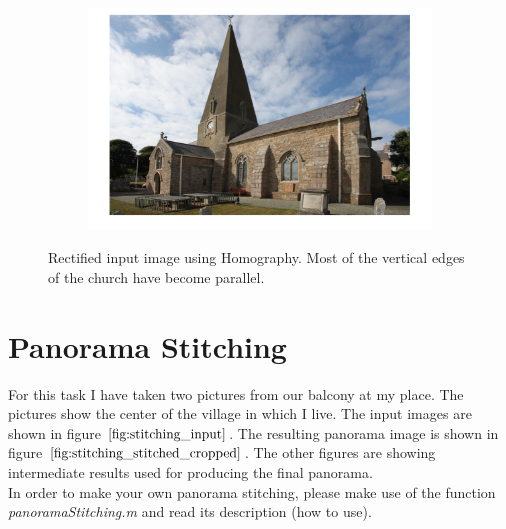 \documentclass{paper}
\begin{document}
\begin{figure}[H]
    \centering
    \begin{subfigure}{1.0\textwidth}
        \includegraphics[width=\textwidth]{rectify/rectified_skewed_church}
    \end{subfigure}
    
    \caption{Rectified input image using Homography. Most of the vertical edges of the church have become parallel. }
    \label{fig:rectified_skewed_church}       
\end{figure}


\section{Panorama Stitching}
For this task I have taken two pictures from our balcony at my place. The pictures show the center of the village in which I live. The input images are shown in figure $\ref{fig:stitching_input}$. The resulting panorama image is shown in figure $\ref{fig:stitching_stitched_cropped}$. The other figures are showing intermediate results used for producing the final panorama. \\

In order to make your own panorama stitching, please make use of the function \emph{panoramaStitching.m} and read its description (how to use).
\end{document}
